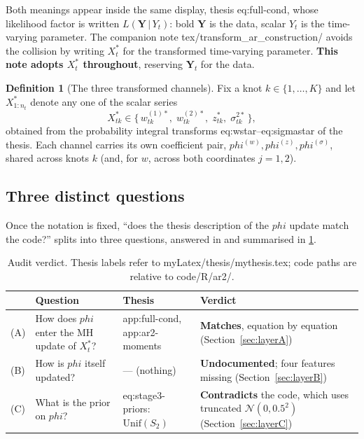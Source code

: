 \documentclass[11pt]{article}
\newcommand{\bphi}{\boldsymbol{\varphi}}
\newcommand{\bY}{\mathbf{Y}}
\newcommand{\Norm}{\mathcal{N}}
\newcommand{\Unif}{\mathrm{Unif}}
\newcommand{\given}{\,\vert\,}
\DeclareRobustCommand{\code}[1]{\texttt{#1}}
\newcommand{\sref}[1]{Section~\ref{#1}}
\def\bphi{phi}%
\def\boldsymbol#1{#1}%
\def\code#1{#1}%
\theoremstyle{plain}
\theoremstyle{definition}
\newtheorem{definition}[proposition]{Definition}
\theoremstyle{remark}
\begin{document}
Both meanings appear inside the same display, thesis \code{eq:full-cond},
whose likelihood factor is written $L(\bY \given Y_t)$: bold $\bY$ is the
data, scalar $Y_t$ is the time-varying parameter. The companion note
\code{tex/transform\_ar\_construction/} avoids the collision by writing
$X^{*}_t$ for the transformed time-varying parameter. \textbf{This note adopts
$X^{*}_t$ throughout}, reserving $\bY_t$ for the data.

\begin{definition}[The three transformed channels]\label{def:channels}
Fix a knot $k \in \{1,\dots,K\}$ and let $X^{*}_{1:n_t}$ denote any one of the
scalar series
\begin{equation}\label{eq:channels}
  X^{*}_{tk} \in
  \bigl\{\, w^{(1)*}_{tk},\; w^{(2)*}_{tk},\; z^{*}_{tk},\; \sigma^{2*}_{tk} \,\bigr\},
\end{equation}
obtained from the probability integral transforms
\code{eq:wstar}--\code{eq:sigmastar} of the thesis. Each channel carries its
own coefficient pair, $\bphi^{(w)}, \bphi^{(z)}, \bphi^{(\sigma)}$, shared
across knots $k$ (and, for $w$, across both coordinates $j = 1,2$).
\end{definition}

\subsection{Three distinct questions}

Once the notation is fixed, ``does the thesis description of the $\bphi$
update match the code?'' splits into three questions, answered in
 and summarised in \cref{tab:verdict}.

\begin{table}[htbp]
\centering
\caption{Audit verdict. Thesis labels refer to \code{myLatex/thesis/mythesis.tex};
code paths are relative to \code{code/R/ar2/}.}
\label{tab:verdict}
\small
\begin{tabular}{@{}p{} p{} p{} p{}@{}}
\toprule
& \textbf{Question} & \textbf{Thesis} & \textbf{Verdict} \\
\midrule
(A) & How does $\bphi$ enter the MH update of $X^{*}_t$?
    & \code{app:full-cond}, \code{app:ar2-moments}
    & \textbf{Matches}, equation by equation (\sref{sec:layerA}) \\
\addlinespace
(B) & How is $\bphi$ itself updated?
    & --- (nothing)
    & \textbf{Undocumented}; four features missing (\sref{sec:layerB}) \\
\addlinespace
(C) & What is the prior on $\bphi$?
    & \code{eq:stage3-priors}: $\Unif(S_2)$
    & \textbf{Contradicts} the code, which uses truncated
      $\Norm(0,0.5^2)$ (\sref{sec:layerC}) \\
\bottomrule
\end{tabular}
\end{table}
\end{document}
